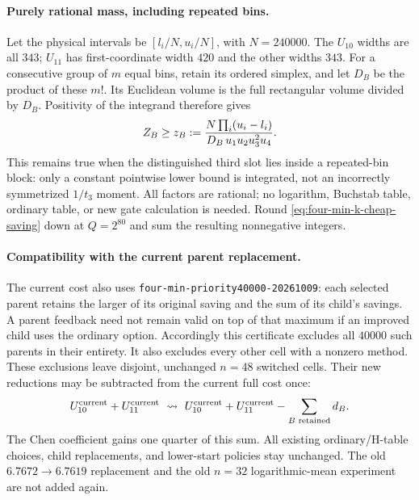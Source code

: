 \paragraph{Purely rational mass, including repeated bins.}
Let the physical intervals be $[l_i/N,u_i/N]$, with $N=240000$.
The $U_{10}$ widths are all $343$; $U_{11}$ has first-coordinate width
$420$ and the other widths $343$.  For a consecutive group of $m$ equal
bins, retain its ordered simplex, and let $D_B$ be the product of these
$m!$.  Its Euclidean volume is the full rectangular volume divided by
$D_B$.  Positivity of the integrand therefore gives
\begin{equation}\label{eq:four-min-k-rational-mass}
 Z_B\ge z_B:={N\prod_i(u_i-l_i)\over
                 D_B\,u_1u_2u_3^2u_4}.
\end{equation}
This remains true when the distinguished third slot lies inside a
repeated-bin block: only a constant pointwise lower bound is integrated,
not an incorrectly symmetrized $1/t_3$ moment.  All factors are rational;
no logarithm, Buchstab table, ordinary table, or new gate calculation is
needed.  Round \eqref{eq:four-min-k-cheap-saving} down at $Q=2^{80}$
and sum the resulting nonnegative integers.

\paragraph{Compatibility with the current parent replacement.}
The current cost also uses \texttt{four-min-priority40000-20261009}:
each selected parent retains the larger of its original saving and the
sum of its child's savings.  A parent feedback need not remain valid
on top of that maximum if an improved child uses the ordinary option.
Accordingly this certificate excludes all $40000$ such parents in their
entirety.  It also excludes every other cell with a nonzero method.
These exclusions leave disjoint, unchanged $n=48$ switched cells.  Their
new reductions may be subtracted from the current full cost once:
\[
 U^{\rm current}_{10}+U^{\rm current}_{11}
 \ \leadsto\ U^{\rm current}_{10}+U^{\rm current}_{11}
                    -\sum_{B\text{ retained}}d_B.
\]
The Chen coefficient gains one quarter of this sum.  All existing
ordinary/H-table choices, child replacements, and lower-start policies
stay unchanged.  The old $6.7672\to6.7619$ replacement and the old
$n=32$ logarithmic-mean experiment are not added again.

